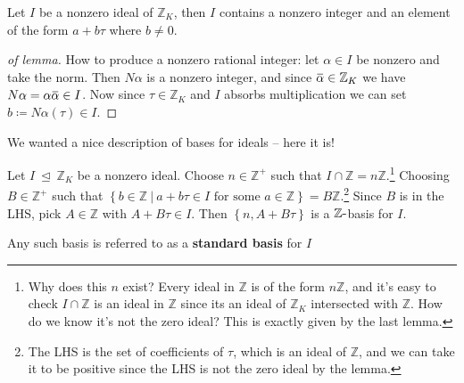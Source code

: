 \begin{lemma}

Let \(I\) be a nonzero ideal of \({\mathbb{Z}}_K\), then \(I\) contains
a nonzero integer and an element of the form \(a + b \tau\) where
\(b\neq 0\).

\end{lemma}

\begin{proof}[of lemma]

How to produce a nonzero rational integer: let \(\alpha\in I\) be
nonzero and take the norm. Then \(N \alpha\) is a nonzero integer, and
since
\(\mkern 1.5mu\overline{\mkern-1.5mu\alpha\mkern-1.5mu}\mkern 1.5mu\in {\mathbb{Z}}_K\)
we have
\(N \alpha = \alpha \mkern 1.5mu\overline{\mkern-1.5mu \alpha\mkern-1.5mu}\mkern 1.5mu \in I\).
Now since \(\tau\in {\mathbb{Z}}_K\) and \(I\) absorbs multiplication we
can set \(b \coloneqq N \alpha(\tau) \in I\).

\end{proof}

\begin{remark}

We wanted a nice description of bases for ideals -- here it is!

\end{remark}

\begin{proposition}

Let \(I {~\trianglelefteq~}{\mathbb{Z}}_K\) be a nonzero ideal. Choose
\(n\in {\mathbb{Z}}^+\) such that
\(I \cap{\mathbb{Z}}= n{\mathbb{Z}}\).\footnote{Why does this \(n\)
  exist? Every ideal in \({\mathbb{Z}}\) is of the form
  \(n{\mathbb{Z}}\), and it's easy to check \(I \cap{\mathbb{Z}}\) is an
  ideal in \({\mathbb{Z}}\) since its an ideal of \({\mathbb{Z}}_K\)
  intersected with \({\mathbb{Z}}\). How do we know it's not the zero
  ideal? This is exactly given by the last lemma.} Choosing
\(B \in {\mathbb{Z}}^+\) such that
\(\left\{{ b\in {\mathbb{Z}}{~\mathrel{\Big|}~}a + b \tau\in I \text{ for some } a \in {\mathbb{Z}}}\right\} = B{\mathbb{Z}}\).\footnote{The
  LHS is the set of coefficients of \(\tau\), which is an ideal of
  \({\mathbb{Z}}\), and we can take it to be positive since the LHS is
  not the zero ideal by the lemma.} Since \(B\) is in the LHS, pick
\(A\in {\mathbb{Z}}\) with \(A + B\tau \in I\). Then
\(\left\{{n, A+B\tau}\right\}\) is a \({\mathbb{Z}}{\hbox{-}}\)basis for
\(I\).

\hfill\break

Any such basis is referred to as a \textbf{standard basis} for \(I\)

\end{proposition}

